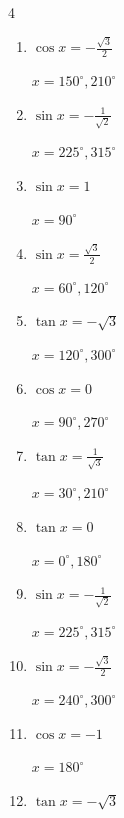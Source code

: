 \begin{multicols}{4}
\begin{enumerate}
        $\displaystyle x = 90^{\circ}$

  \item $\displaystyle \cos{x}  = -\frac{\sqrt{3}}{2}$

        $\displaystyle x = 150^{\circ} , 210^{\circ}$

  \item $\displaystyle \sin{x}  = -\frac{1}{\sqrt{2}}$

        $\displaystyle x = 225^{\circ} , 315^{\circ}$

  \item $\displaystyle \sin{x}  = 1$

        $\displaystyle x = 90^{\circ}$

  \item $\displaystyle \sin{x}  = \frac{\sqrt{3}}{2}$

        $\displaystyle x = 60^{\circ} , 120^{\circ}$

  \item $\displaystyle \tan{x}  = -\sqrt{3}$

        $\displaystyle x = 120^{\circ} , 300^{\circ}$

  \item $\displaystyle \cos{x}  = 0$

        $\displaystyle x = 90^{\circ} , 270^{\circ}$

  \item $\displaystyle \tan{x}  = \frac{1}{\sqrt{3}}$

        $\displaystyle x = 30^{\circ} , 210^{\circ}$

  \item $\displaystyle \tan{x}  = 0$

        $\displaystyle x = 0^{\circ} , 180^{\circ}$

  \item $\displaystyle \sin{x}  = -\frac{1}{\sqrt{2}}$

        $\displaystyle x = 225^{\circ} , 315^{\circ}$

  \item $\displaystyle \sin{x}  = -\frac{\sqrt{3}}{2}$

        $\displaystyle x = 240^{\circ} , 300^{\circ}$

  \item $\displaystyle \cos{x}  = -1$

        $\displaystyle x = 180^{\circ}$

  \item $\displaystyle \tan{x}  = -\sqrt{3}$


\end{enumerate}
\end{multicols}
